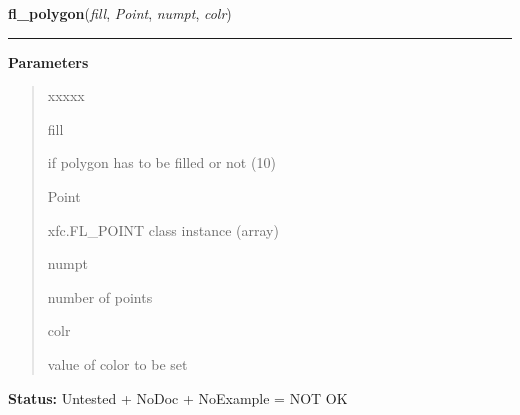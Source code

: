 \hspace{.8\funcindent}\begin{boxedminipage}{\funcwidth}

    \raggedright \textbf{fl\_polygon}(\textit{fill}, \textit{Point}, \textit{numpt}, \textit{colr})

    \vspace{-1.5ex}

    \rule{\textwidth}{0.5\fboxrule}
\setlength{\parskip}{2ex}
\setlength{\parskip}{1ex}
      \textbf{Parameters}
      \vspace{-1ex}

      \begin{quote}
        \begin{Ventry}{xxxxx}

          \item[fill]

          if polygon has to be filled or not (1{\textbar}0)

          \item[Point]

          xfc.FL\_POINT class instance (array)

          \item[numpt]

          number of points

          \item[colr]

          value of color to be set

        \end{Ventry}

      \end{quote}

\textbf{Status:} Untested + NoDoc + NoExample = NOT OK



    \end{boxedminipage}

    \label{xformslib:library:fl_polyf}

    \vspace{0.5ex}

